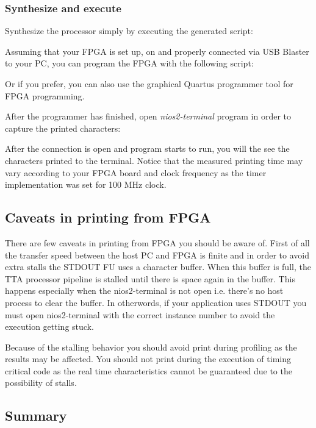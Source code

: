 \documentclass[a4paper,twoside]{tceusermanual}
\begin{document}
\subsubsection{Synthesize and execute}

Synthesize the processor simply by executing the generated script:


Assuming that your FPGA is set up, on and properly connected via USB
Blaster to your PC, you can program the FPGA with the following script:


Or if you prefer, you can also use the graphical Quartus programmer
tool for FPGA programming.

After the programmer has finished, open \textit{nios2-terminal}
program in order to capture the printed characters:


After the connection is open and program starts to run, you will the
see the characters printed to the terminal. Notice that the measured
printing time may vary according to your FPGA board and clock
frequency as the timer implementation was set for 100 MHz clock.

\subsection{Caveats in printing from FPGA}

There are few caveats in printing from FPGA you should be aware
of. First of all the transfer speed between the host PC and FPGA is
finite and in order to avoid extra stalls the STDOUT FU uses a
character buffer. When this buffer is full, the TTA processor pipeline
is stalled until there is space again in the buffer. This happens
especially when the nios2-terminal is not open i.e. there's no host
process to clear the buffer. In otherwords, if your application uses
STDOUT you must open nios2-terminal with the correct instance number
to avoid the execution getting stuck.

Because of the stalling behavior you should avoid print during
profiling as the results may be affected. You should not print during
the execution of timing critical code as the real time characteristics
cannot be guaranteed due to the possibility of stalls.


\subsection{Summary}
\end{document}
